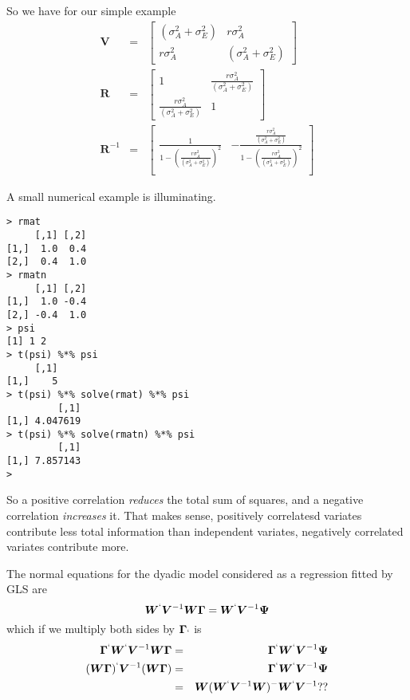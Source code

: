 \documentclass[titlepage,a4paper,12pt]{article}  %
\begin{document}
So we have for our simple example
\begin{eqnarray*}
\bm{V} & = & \begin{bmatrix} (\sigma^{2}_{A} + \sigma^{2}_{E}) & r \sigma^{2}_{A} \\ r \sigma^{2}_{A} & (\sigma^{2}_{A} + \sigma^{2}_{E}) \end{bmatrix} \\
\bm{R} & = & \begin{bmatrix} 1 & \frac{r \sigma^{2}_{A}}{(\sigma^{2}_{A} + \sigma^{2}_{E})} \\ \frac{r \sigma^{2}_{A}}{(\sigma^{2}_{A} + \sigma^{2}_{E})} & 1 \end{bmatrix} \\
\bm{R}^{-1} & = & \begin{bmatrix} \frac{1}{1 - (\frac{r \sigma^{2}_{A}}{(\sigma^{2}_{A} + \sigma^{2}_{E})})^{2}}  & - \frac{\frac{r \sigma^{2}_{A}}{(\sigma^{2}_{A} + \sigma^{2}_{E})}}{1 - (\frac{r \sigma^{2}_{A}}{(\sigma^{2}_{A} + \sigma^{2}_{E})})^{2}} \\ &  \end{bmatrix}
\end{eqnarray*}

A small numerical example is illuminating. 
\begin{verbatim}
> rmat
     [,1] [,2]
[1,]  1.0  0.4
[2,]  0.4  1.0
> rmatn
     [,1] [,2]
[1,]  1.0 -0.4
[2,] -0.4  1.0
> psi
[1] 1 2
> t(psi) %*% psi
     [,1]
[1,]    5
> t(psi) %*% solve(rmat) %*% psi
         [,1]
[1,] 4.047619
> t(psi) %*% solve(rmatn) %*% psi
         [,1]
[1,] 7.857143
> 
\end{verbatim}
So a positive correlation {\em reduces} the total sum of squares, and a negative correlation {\em increases} it. That makes sense, positively correlatesd variates contribute less total information than independent variates, negatively correlated variates contribute more.

The normal equations for the dyadic model considered as a regression fitted by GLS are
\begin{displaymath}
\bm{W}^{`} \bm{V}^{-1} \bm{W} \bm{\Gamma} = \bm{W}^{`} \bm{V}^{-1} \bm{\Psi}
\end{displaymath}
which if we multiply both sides by $\bm{\Gamma}_{`}$ is
\begin{eqnarray*}
\bm{\Gamma}^{`} \bm{W}^{`} \bm{V}^{-1} \bm{W} \bm{\Gamma} & = & \bm{\Gamma}^{`} \bm{W}^{`} \bm{V}^{-1} \bm{\Psi}  \\
(\bm{W}\bm{\Gamma})^{`} \bm{V}^{-1} (\bm{W}\bm{\Gamma}) & = & \bm{\Gamma}^{`} \bm{W}^{`} \bm{V}^{-1} \bm{\Psi} \\
& = & \bm{W}(\bm{W}^{`} \bm{V}^{-1} \bm{W})^{-}\bm{W}^{`} \bm{V}^{-1} ??
\end{eqnarray*}
\end{document}
